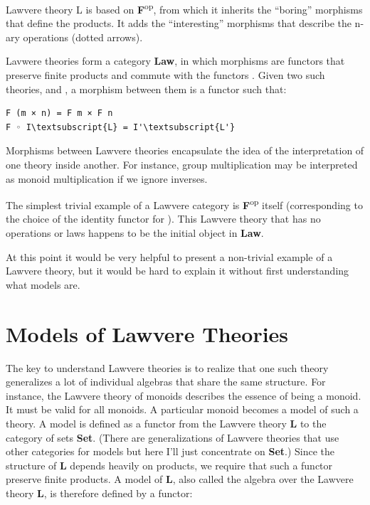 \noindent
Lawvere theory L is based on \textbf{F}\textsuperscript{op}, from which
it inherits the ``boring'' morphisms that define the products. It adds
the ``interesting'' morphisms that describe the n-ary operations (dotted
arrows).

Lavwere theories form a category \textbf{Law}, in which morphisms are
functors that preserve finite products and commute with the functors
. Given two such theories,  and
, a morphism between them is a
functor  such that:

\begin{Verbatim}[commandchars=\\\{\}]
F (m × n) = F m × F n
F ◦ I\textsubscript{L} = I'\textsubscript{L'}
\end{Verbatim}
Morphisms between Lawvere theories encapsulate the idea of the
interpretation of one theory inside another. For instance, group
multiplication may be interpreted as monoid multiplication if we ignore
inverses.

The simplest trivial example of a Lawvere category is
\textbf{F}\textsuperscript{op} itself (corresponding to the choice of
the identity functor for ). This Lawvere theory that has no
operations or laws happens to be the initial object in \textbf{Law}.

At this point it would be very helpful to present a non-trivial example
of a Lawvere theory, but it would be hard to explain it without first
understanding what models are.

\section{Models of Lawvere Theories}\label{models-of-lawvere-theories}

The key to understand Lawvere theories is to realize that one such
theory generalizes a lot of individual algebras that share the same
structure. For instance, the Lawvere theory of monoids describes the
essence of being a monoid. It must be valid for all monoids. A
particular monoid becomes a model of such a theory. A model is defined
as a functor from the Lawvere theory \textbf{L} to the category of sets
\textbf{Set}. (There are generalizations of Lawvere theories that use
other categories for models but here I'll just concentrate on
\textbf{Set}.) Since the structure of \textbf{L} depends heavily on
products, we require that such a functor preserve finite products. A
model of \textbf{L}, also called the algebra over the Lawvere theory
\textbf{L}, is therefore defined by a functor:

